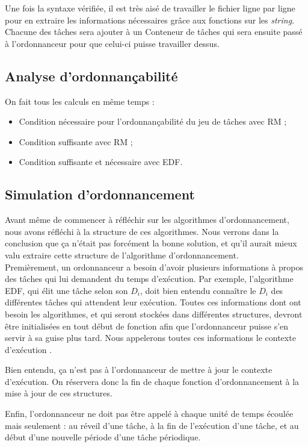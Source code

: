 				Une fois la syntaxe vérifiée, il est très aisé de travailler le fichier ligne par ligne pour en extraire les informations nécessaires grâce aux fonctions sur les \emph{string}. Chacune des tâches sera ajouter à un Conteneur de tâches qui sera ensuite passé à l'ordonnanceur pour que celui-ci puisse travailler dessus.
			
			\subsection{Analyse d'ordonnançabilité}
				On fait tous les calculs en même temps :
				\begin{itemize}
					\item Condition nécessaire pour l'ordonnançabilité du jeu de tâches avec RM ;
					\item Condition suffisante avec RM ;
					\item Condition suffisante et nécessaire avec EDF.
				\end{itemize}
		
			\subsection{Simulation d'ordonnancement}

				Avant même de commencer à réfléchir sur les algorithmes d'ordonnancement, nous avons réfléchi à la structure de ces algorithmes. Nous verrons dans la conclusion que ça n'était pas forcément la bonne solution, et qu'il aurait mieux valu extraire cette structure de l'algorithme d'ordonnancement.\\
				
				Premièrement, un ordonnanceur a besoin d'avoir plusieurs informations à propos des tâches qui lui demandent du temps d'exécution. Par exemple, l'algorithme EDF, qui élit une tâche selon son $D_i$, doit bien entendu connaître le $D_i$ des différentes tâches qui attendent leur exécution. Toutes ces informations dont ont besoin les algorithmes, et qui seront stockées dans différentes structures, devront être initialisées en tout début de fonction afin que l'ordonnanceur puisse s'en servir à sa guise plus tard. Nous appelerons toutes ces informations le \og contexte d'exécution \fg.
				
				Bien entendu, ça n'est pas à l'ordonnanceur de mettre à jour le contexte d'exécution. On réservera donc la fin de chaque fonction d'ordonnancement à la mise à jour de ces structures.
				
				Enfin, l'ordonnanceur ne doit pas être appelé à chaque unité de temps écoulée mais seulement : au réveil d'une tâche, à la fin de l'exécution d'une tâche, et au début d'une nouvelle période d'une tâche périodique.\\
				
